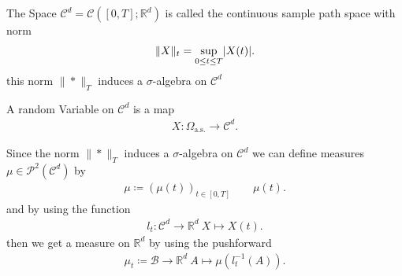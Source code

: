 \begin{definition}
 The Space  $\mathcal{C}^{d} = \mathcal{C}([0,T];\mathbb{R}^{d} ) $ is called the continuous sample path space with norm 
 \begin{align*}
   \|X\|_t = \sup_{0\le t \le T} \lvert X(t)\rvert
 .\end{align*}
 this norm $\|*\|_T$ induces a $\sigma$-algebra on $\mathcal{C}^{d} $ 
\end{definition}
\begin{definition}
  A random Variable on $\mathcal{C}^{d} $ is a map 
  \begin{align*}
    X : \Omega_{\text{a.s.}} \to \mathcal{C}^{d} 
  .\end{align*}
\end{definition}
\begin{definition}[Measure]
 Since the norm $\|*\|_T$  induces a $\sigma$-algebra on $\mathcal{C}^{d} $ we can define measures $\mu \in \mathcal{P}^2(\mathcal{C}^{d} )$ by 
 \begin{align*}
   \mu  \coloneqq  (\mu(t))_{t \in  [0,T]} \qquad \mu(t)
 .\end{align*}
 and by using the function 
 \begin{align*}
  l_t : \mathcal{C}^{d} \to  \mathbb{R}^{d} \ X \mapsto X(t)  
 .\end{align*}
 then we get a measure on $\mathbb{R}^{d} $ by using the pushforward
 \begin{align*}
  \mu_t \coloneqq \mathcal{B} \to \mathbb{R}^{d}   \ A \mapsto \mu(l^{-1}_t(A) )
 .\end{align*}
\end{definition}

